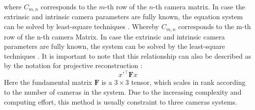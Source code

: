 \documentclass[5p,times,procedia]{elsarticle}
\begin{document}
%
where $C_{m,n}$ corresponds to the $m$-th row of the $n$-th camera matrix.
In case the extrinsic and intrinsic camera parameters are fully known, the equation system can be solved by least-square techniques \cite{Ahn2004}.
%
Whereby $C_{m,n}$ corresponds to the m-th row of the n-th camera Matrix.
In case the extrinsic and intrinsic camera parameters are fully known, the system can be solved by the least-square techniques \cite{Ahn2004}.
%
It is important to note that this relationship can also be described as by the notation for projective reconstruction \cite{Hartley2018}:
\begin{equation}
	\label{eqn:ProjectiveReconstruction}
	x’^{\top}\mathbf{F}x
\end{equation}
%
Here the fundamental matrix $\mathbf{F}$ is a $3\times 3$ tensor, which scales in rank according to the number of cameras in the system. Due to the increasing complexity and computing effort, this method is usually constraint to three cameras systems.\\
\end{document}
